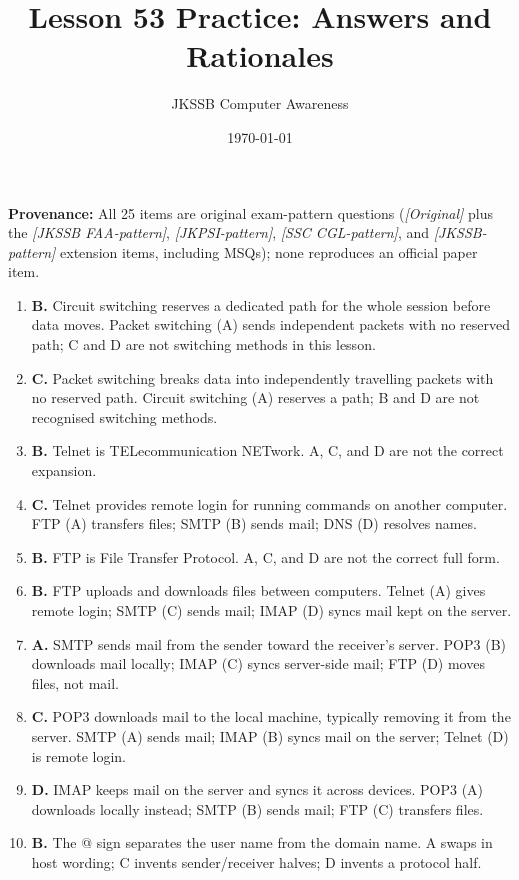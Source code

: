 \documentclass[11pt]{article}
\title{Lesson 53 Practice: Answers and Rationales}
\author{JKSSB Computer Awareness}
\date{\today}
\begin{document}
\maketitle
\noindent\textbf{Provenance:} All 25 items are original exam-pattern questions (\textit{[Original]} plus the \textit{[JKSSB FAA-pattern]}, \textit{[JKPSI-pattern]}, \textit{[SSC CGL-pattern]}, and \textit{[JKSSB-pattern]} extension items, including MSQs); none reproduces an official paper item.
\begin{enumerate}[label=\textbf{Q\arabic*.}, leftmargin=*]
\item \textbf{B.} Circuit switching reserves a dedicated path for the whole
  session before data moves. Packet switching (A) sends independent packets
  with no reserved path; C and D are not switching methods in this lesson.
\item \textbf{C.} Packet switching breaks data into independently travelling
  packets with no reserved path. Circuit switching (A) reserves a path;
  B and D are not recognised switching methods.
\item \textbf{B.} Telnet is TELecommunication NETwork. A, C, and D are not
  the correct expansion.
\item \textbf{C.} Telnet provides remote login for running commands on
  another computer. FTP (A) transfers files; SMTP (B) sends mail; DNS (D)
  resolves names.
\item \textbf{B.} FTP is File Transfer Protocol. A, C, and D are not the
  correct full form.
\item \textbf{B.} FTP uploads and downloads files between computers. Telnet
  (A) gives remote login; SMTP (C) sends mail; IMAP (D) syncs mail kept on
  the server.
\item \textbf{A.} SMTP sends mail from the sender toward the receiver's
  server. POP3 (B) downloads mail locally; IMAP (C) syncs server-side mail;
  FTP (D) moves files, not mail.
\item \textbf{C.} POP3 downloads mail to the local machine, typically
  removing it from the server. SMTP (A) sends mail; IMAP (B) syncs mail on
  the server; Telnet (D) is remote login.
\item \textbf{D.} IMAP keeps mail on the server and syncs it across devices.
  POP3 (A) downloads locally instead; SMTP (B) sends mail; FTP (C) transfers
  files.
\item \textbf{B.} The @ sign separates the user name from the domain name.
  A swaps in host wording; C invents sender/receiver halves; D invents a
  protocol half.

\end{enumerate}
\end{document}
